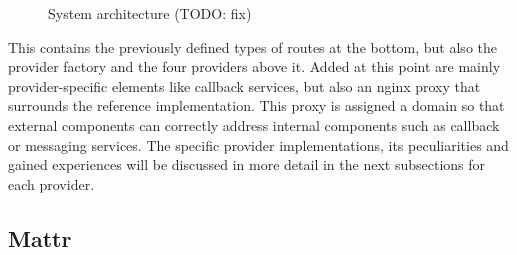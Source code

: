     \begin{figure}[ht]
	    \centering    	    \makebox[\textwidth]{}       \caption{System architecture (TODO: fix)}
        \label{figure: sys architecture}
    \end{figure}
    
    This contains the previously defined types of routes at the bottom, but also the provider factory and the four providers above it. Added at this point are mainly provider-specific elements like callback services, but also an nginx proxy that surrounds the reference implementation. This proxy is assigned a domain so that external components can correctly address internal components such as callback or messaging services. The specific provider implementations, its peculiarities and gained experiences will be discussed in more detail in the next subsections for each provider.
    
        \subsection{Mattr}
        
